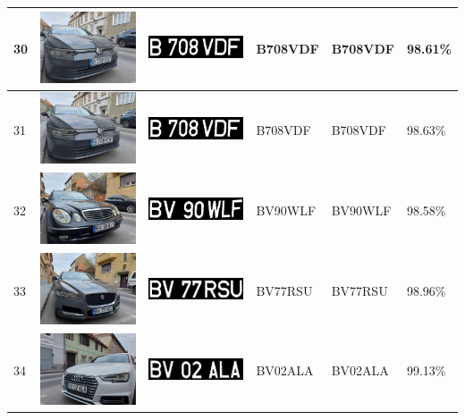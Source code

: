 \documentclass[a4paper,12pt]{report}
\begin{document}
\begin{longtable}{| m{0.6cm} | m{3cm} | m{3cm} | m{1.8cm} | m{1.8cm} | m{1.8cm} |}
        30 & \includegraphics[width=3cm,keepaspectratio]{dataset/16_s1.jpg} & \includegraphics[width=3cm,keepaspectratio]{segmentari/30.jpg} & B708VDF & B708VDF & 98.61\% \\ \hline
        31 & \includegraphics[width=3cm,keepaspectratio]{dataset/16_s2.jpg} & \includegraphics[width=3cm,keepaspectratio]{segmentari/31.jpg} & B708VDF & B708VDF & 98.63\% \\ \hline
        32 & \includegraphics[width=3cm,keepaspectratio]{dataset/17_s1.jpg} & \includegraphics[width=3cm,keepaspectratio]{segmentari/32.jpg} & BV90WLF & BV90WLF & 98.58\% \\ \hline
        33 & \includegraphics[width=3cm,keepaspectratio]{dataset/18_s1.jpg} & \includegraphics[width=3cm,keepaspectratio]{segmentari/33.jpg} & BV77RSU & BV77RSU & 98.96\% \\ \hline
        34 & \includegraphics[width=3cm,keepaspectratio]{dataset/19_d1.jpg} & \includegraphics[width=3cm,keepaspectratio]{segmentari/34.jpg} & BV02ALA & BV02ALA & 99.13\% \\ \hline

\end{longtable}
\end{document}
